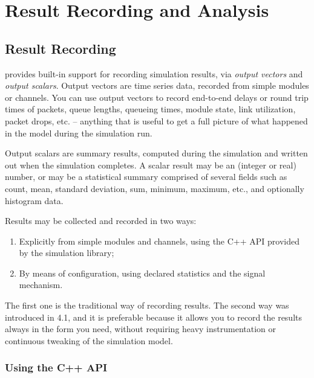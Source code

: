 \chapter{Result Recording and Analysis}
\label{cha:analyzing-simulation-results}

\section{Result Recording}

{\opp} provides built-in support for recording simulation results, via
\textit{output vectors} and \textit{output scalars}. Output vectors are
time series data, recorded from simple modules or channels. You can use
output vectors to record end-to-end delays or round trip times of packets,
queue lengths, queueing times, module state, link utilization, packet
drops, etc. -- anything that is useful to get a full picture of what
happened in the model during the simulation run.

Output scalars are summary results, computed during the simulation and
written out when the simulation completes. A scalar result may be an
(integer or real) number, or may be a statistical summary comprised of
several fields such as count, mean, standard deviation, sum, minimum,
maximum, etc., and optionally histogram data.

Results may be collected and recorded in two ways:

\begin{enumerate}
  \item Explicitly from simple modules and channels, using the C++ API
    provided by the simulation library;
  \item By means of configuration, using declared statistics and the
    signal mechanism.
\end{enumerate}

The first one is the traditional way of recording results. The second way
was introduced in {\opp} 4.1, and it is preferable because it allows you
to record the results always in the form you need, without requiring heavy
instrumentation or continuous tweaking of the simulation model.

\subsection{Using the C++ API}

